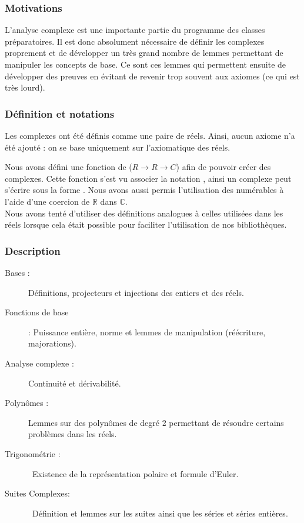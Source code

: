\subsubsection{Motivations}

L'analyse complexe est une importante partie du programme des classes préparatoires. Il est donc absolument nécessaire de définir les complexes proprement et de développer un très grand nombre de lemmes permettant de manipuler les concepts de base. Ce sont ces lemmes qui permettent ensuite de développer des preuves en évitant de revenir trop souvent aux axiomes (ce qui est très lourd).

\subsubsection{Définition et notations}

Les complexes ont été définis comme une paire de réels. Ainsi, aucun axiome n'a été ajouté : on se base uniquement sur l'axiomatique des réels.

Nous avons défini une fonction de ($R \rightarrow R \rightarrow C$) afin de pouvoir créer des complexes. Cette fonction s'est vu associer la notation , ainsi un complexe peut s'écrire sous la forme . Nous avons aussi permis l'utilisation des numérables à l'aide d'une coercion de $\mathbb{R}$ dans $\mathbb{C}$.\\
Nous avons tenté d'utiliser des définitions analogues à celles utilisées dans les réels lorsque cela était possible pour faciliter l'utilisation de nos bibliothèques.

\subsubsection{Description}

\begin{description}
 \item [Bases :] Définitions, projecteurs et injections des entiers et des réels.
 \item [Fonctions de base] : Puissance entière, norme et lemmes de manipulation (réécriture, majorations).
 \item [Analyse complexe :] Continuité et dérivabilité.
 \item [Polynômes :] Lemmes sur des polynômes de degré 2 permettant de résoudre certains problèmes dans les réels.
 \item [Trigonométrie :] Existence de la représentation polaire et formule d'Euler.
 \item [Suites Complexes:] Définition et lemmes sur les suites ainsi que les séries et séries entières.
\end{description}

